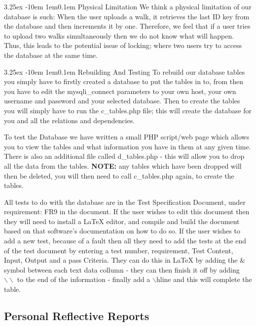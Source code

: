 \documentclass[12pt]{article}
\makeatletter
\renewcommand{\paragraph}{
  \@startsection{paragraph}{4}
  {\z@}{3.25ex \@plus -10em \@minus 1em}{0.1em}
  {\normalfont\normalsize\bfseries}
}
\makeatother
\begin{document}
\paragraph{Physical Limitation}
We think a physical limitation of our database is such: When the user uploads a walk, it retrieves the last ID key from the database and then increments it by one. Therefore, we feel that if a user tries to upload two walks simultaneously then we do not know what will happen. Thus, this leads to the potential issue of locking; where two users try to access the database at the same time.
\paragraph{Rebuilding And Testing}
To rebuild our database tables you simply have to firstly created a database to put the tables in to, from then you have to edit the mysqli\_connect parameters to your own host, your own username and password and your selected database. Then to create the tables you will simply have to run the c\_tables.php file; this will create the database for you and all the relations and dependencies.

To test the Database we have written a small PHP script/web page which allows you to view the tables and what information you have in them at any given time. There is also an additional file called d\_tables.php - this will allow you to drop all the data from the tables. \textbf{NOTE:} any tables which have been dropped will then be deleted, you will then need to call c\_tables.php again, to create the tables.

All tests to do with the database are in the Test Specification Document, under requirement: FR9 in the document. If the user wishes to edit this document then they will need to install a LaTeX editor,  and compile and build the document based on that software's documentation on how to do so. If the user wishes to add a new test, because of a fault then all they need to add the tests at the end of the test document by entering a test number, requirement, Test Content, Input, Output and a pass Criteria. They can do this in LaTeX by adding the \& symbol between each text data collumn - they can then finish it off by adding $\backslash \backslash$ to the end of the information - finally add a $\backslash$hline and this will complete the table. 
\newpage
\subsection{Personal Reflective Reports}
\end{document}
